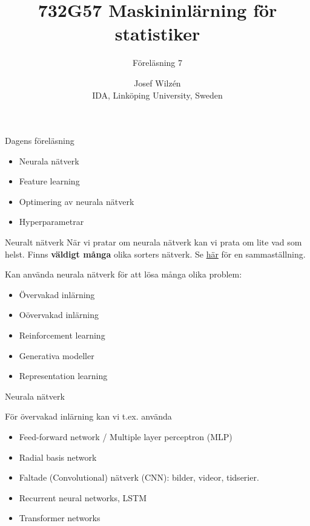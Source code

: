 \documentclass[10pt,english]{beamer}
\title{732G57 Maskininlärning för statistiker}
\subtitle{Föreläsning 7}
\date{}
\author{Josef Wilzén \\ IDA, Linköping University, Sweden}
\begin{document}
\maketitle

\begin{frame}{Dagens föreläsning}

    \begin{itemize}
        \item Neurala nätverk
        \item Feature learning
        \item Optimering av neurala nätverk
        \item Hyperparametrar
    \end{itemize}
    
\end{frame}


\begin{frame}{Neuralt nätverk}
    När vi pratar om neurala nätverk kan vi prata om lite vad som helst. Finns \textbf{väldigt många} olika sorters nätverk. Se \href{https://www.asimovinstitute.org/neural-network-zoo/}{här} för en sammaställning.

    Kan använda neurala nätverk för att lösa många olika problem:
    \begin{itemize}
        \item Övervakad inlärning
        \item Oövervakad inlärning
        \item Reinforcement learning
        \item Generativa modeller
        \item Representation learning
    \end{itemize}

\end{frame}


\begin{frame}{Neurala nätverk}
    
    För övervakad inlärning kan vi t.ex. använda
    \begin{itemize}
        \item Feed-forward network / Multiple layer perceptron (MLP)
        \item Radial basis network
        \item Faltade (Convolutional) nätverk (CNN): bilder, videor, tidserier.
        \item Recurrent neural networks, LSTM
        \item Transformer networks 
    \end{itemize}

\end{frame}
\end{document}
